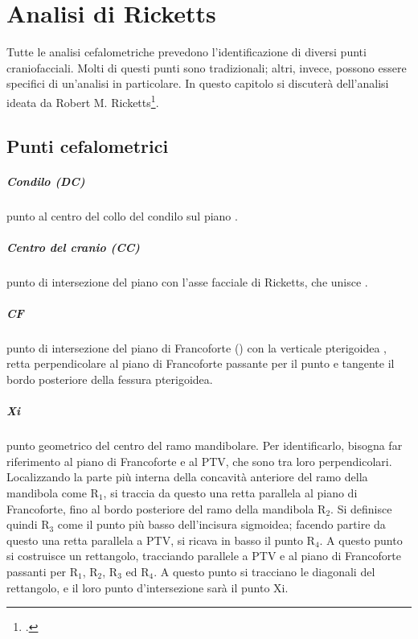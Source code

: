 \chapter{Analisi di Ricketts}

Tutte le analisi cefalometriche prevedono l'identificazione di diversi punti craniofacciali. Molti di questi punti sono tradizionali; altri, invece, possono essere specifici di un'analisi in particolare. In questo capitolo si discuterà dell'analisi ideata da Robert M. Ricketts\footcite{Lucchese1988}.

\section{Punti cefalometrici}

\paragraph{Condilo (DC)} punto al centro del collo del condilo sul piano .

\paragraph{Centro del cranio (CC)} punto di intersezione del piano  con l'asse facciale di Ricketts, che unisce .

\paragraph{CF} punto di intersezione del piano di Francoforte () con la verticale pterigoidea , retta perpendicolare al piano di Francoforte passante per il punto  e tangente il bordo posteriore della fessura pterigoidea.

\paragraph{Xi} punto geometrico del centro del ramo mandibolare. Per identificarlo, bisogna far riferimento al piano di Francoforte e al PTV, che sono tra loro perpendicolari. Localizzando la parte più interna della concavità anteriore del ramo della mandibola come R$_1$, si traccia da questo una retta parallela al piano di Francoforte, fino al bordo posteriore del ramo della mandibola R$_2$. Si definisce quindi R$_3$ come il punto più basso dell'incisura sigmoidea; facendo partire da questo una retta parallela a PTV, si ricava in basso il punto R$_4$. A questo punto si costruisce un rettangolo, tracciando parallele a PTV e al piano di Francoforte passanti per R$_1$, R$_2$, R$_3$ ed R$_4$. A questo punto si tracciano le diagonali del rettangolo, e il loro punto d'intersezione sarà il punto Xi.

